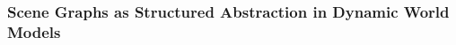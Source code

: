\subsubsection{Scene Graphs as Structured Abstraction in Dynamic World Models}\label{sec:dyn_world_model_representations_scene_graphs}


